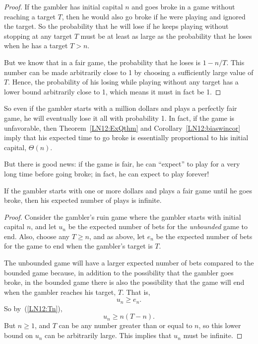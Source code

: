 \begin{example}
\begin{proof}
If the gambler has initial capital $n$ and goes broke in a game without
reaching a target $T$, then he would also go broke if he were playing and
ignored the target.  So the probability that he will lose if he keeps
playing without stopping at any target $T$ must be at least as large as the
probability that he loses when he has a target $T>n$.

But we know that in a fair game, the probability that he loses is $1 -
n/T$.  This number can be made arbitrarily close to 1 by choosing a
sufficiently large value of $T$.  Hence, the probability of his losing
while playing without any target has a lower bound arbitrarily close to 1,
which means it must in fact be 1.
\end{proof}

So even if the gambler starts with a million dollars and plays a perfectly
fair game, he will eventually lose it all with probability 1.  In fact, if
the game is unfavorable, then Theorem~\ref{LN12:ExQthm} and
Corollary~\ref{LN12:biaswincor} imply that his expected time to go broke is
essentially proportional to his initial capital, \ie $\Theta(n)$.

But there is good news: if the game is fair, he can ``expect'' to play for
a very long time before going broke; in fact, he can expect to play
forever!

\begin{lemma}\label{LN12:play forever}
If the gambler starts with one or more dollars and plays a fair game until
he goes broke, then his expected number of plays is infinite.
\end{lemma}

\begin{proof}
Consider the gambler's ruin game where the gambler starts with initial
capital $n$, and let $u_n$ be the expected number of bets for
the \emph{unbounded} game to end.  Also, choose any $T \geq n$, and as
above, let $e_n$ be the expected number of bets for the game to end when
the gambler's target is $T$.

The unbounded game will have a larger expected number of bets compared to
the bounded game because, in addition to the possibility that the gambler
goes broke, in the bounded game there is also the possibility that the
game will end when the gambler reaches his target, $T$.  That is,
\[
u_n \geq e_n.
\]
So by~(\ref{LN12:Tn}), 
\[
u_n \geq n(T-n).
\]
But $n \geq 1$, and $T$ can be any number greater than or equal to $n$, so
this lower bound on $u_n$ can be arbitrarily large.  This implies that
$u_n$ must be infinite.


\end{proof}
\end{example}
